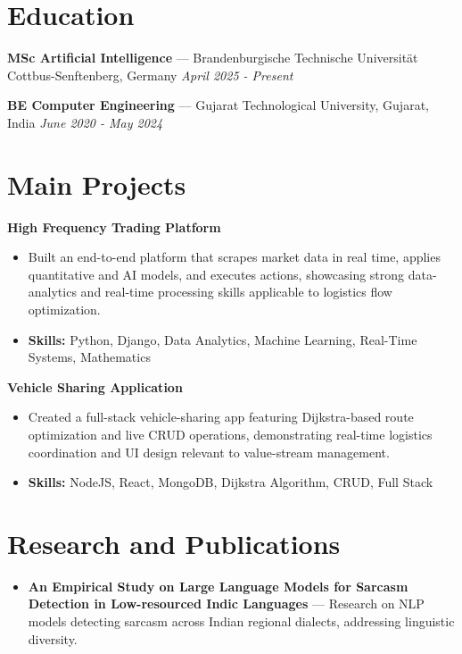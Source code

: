 \documentclass[a4paper,10pt]{article}
\begin{document}
\section*{Education}
\textbf{MSc Artificial Intelligence} — Brandenburgische Technische Universität Cottbus-Senftenberg, Germany \hfill \textit{April 2025 - Present}\par
\vspace{1.5pt}
\textbf{BE Computer Engineering} — Gujarat Technological University, Gujarat, India \hfill \textit{June 2020 - May 2024}\par

\section*{Main Projects}
\textbf{High Frequency Trading Platform}\par
\vspace{1pt}
\begin{itemize}
  \item Built an end-to-end platform that scrapes market data in real time, applies quantitative and AI models, and executes actions, showcasing strong data-analytics and real-time processing skills applicable to logistics flow optimization.
  \item \textbf{Skills:} Python, Django, Data Analytics, Machine Learning, Real-Time Systems, Mathematics
\end{itemize}
\vspace{3pt}
\textbf{Vehicle Sharing Application}\par
\vspace{1pt}
\begin{itemize}
  \item Created a full-stack vehicle-sharing app featuring Dijkstra-based route optimization and live CRUD operations, demonstrating real-time logistics coordination and UI design relevant to value-stream management.
  \item \textbf{Skills:} NodeJS, React, MongoDB, Dijkstra Algorithm, CRUD, Full Stack
\end{itemize}

\section*{Research and Publications}
\begin{itemize}
\item \textbf{An Empirical Study on Large Language Models for Sarcasm Detection in Low-resourced Indic Languages} — Research on NLP models detecting sarcasm across Indian regional dialects, addressing linguistic diversity.
\end{itemize}
\end{document}
